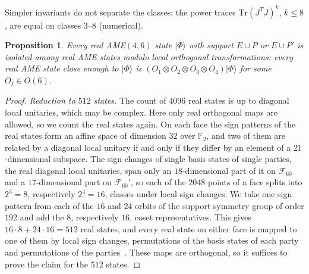 \documentclass[aps,pra,reprint,superscriptaddress,amsmath,amssymb,longbibliography]{revtex4-2}
\newcommand{\ket}[1]{\lvert #1\rangle}
\theoremstyle{plain}
\newtheorem{proposition}{Proposition}
\begin{document}
Simpler invariants do not separate the classes: the power traces $\mathrm{Tr}(J^TJ)^k$, $k\le8$, are equal on
classes $3$--$8$ (numerical).
\begin{proposition}\label{prop:real-isolation}
Every real AME$(4,6)$ state $\ket\Phi$ with support $E\cup P$ or $E\cup P'$ is isolated among real AME states modulo
local orthogonal transformations: every real AME state close enough to $\ket\Phi$ is $(O_1\otimes O_2\otimes
O_3\otimes O_4)\ket\Phi$ for some $O_j\in O(6)$.
\end{proposition}

\begin{proof}
\emph{Reduction to $512$ states.}  The count of $4096$ real states is up to diagonal local unitaries, which may be
complex.  Here only real orthogonal maps are allowed, so we count the real states again.  On each face the
sign patterns of the real states form an affine space of dimension $32$ over $\mathbb F_2$, and two of them are related
by a diagonal local unitary if and only if they differ by an element of a $21$-dimensional subspace.  The sign changes
of single basis states of single parties, the real diagonal local unitaries, span only an $18$-dimensional part of it on
$\mathcal F_{60}$ and a $17$-dimensional part on $\mathcal F_{60}'$, so each of the $2048$ points of a face splits into
$2^3=8$, respectively $2^4=16$, classes under local sign changes.  We take one sign pattern from each of the $16$ and $24$
orbits of the support symmetry group of order $192$ and add the $8$, respectively $16$, coset representatives.  This
gives $16\cdot8+24\cdot16=512$ real states, and every real state on either face is mapped to one of them by local sign
changes, permutations of the basis states of each party and permutations of the parties~\cite{repo}.  These maps are
orthogonal, so it suffices to prove the claim for the $512$ states.


\end{proof}
\end{document}

